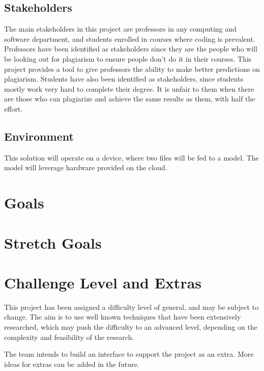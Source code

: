 \documentclass{article}
\begin{document}
\subsection{Stakeholders}
The main stakeholders in this project are professors in any computing and software department, and students enrolled in courses where coding is prevalent. Professors have been identified as stakeholders since they are the people who will be looking out for plagiarism to ensure people don't do it in their courses. This project provides a tool to give professors the ability to make better predictions on plagiarism. Students have also been identified as stakeholders, since students mostly work very hard to complete their degree. It is unfair to them when there are those who can plagiarize and achieve the same results as them, with half the effort.

\subsection{Environment}
This solution will operate on a device, where two files will be fed to a model. The model will leverage hardware provided on the cloud.



\section{Goals}

\section{Stretch Goals}

\section{Challenge Level and Extras}
This project has been assigned a difficulty level of general, and may be subject to change. The aim is to use well known techniques that have been extensively researched, which may push the difficulty to an advanced level, depending on the complexity and feasibility of the research. 


The team intends to build an interface to support the project as an extra. More ideas for extras can be added in the future.

\end{document}
